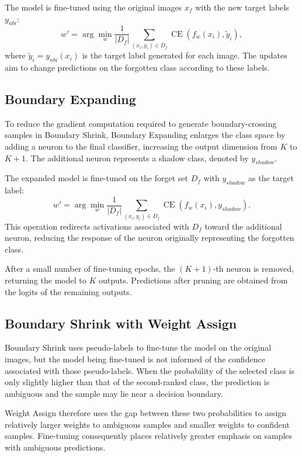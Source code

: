 \documentclass[conference]{IEEEtran}
\newcommand{\CE}{\operatorname{CE}}
\begin{document}
The model is fine-tuned using the original images $x_f$ with the new target labels $y_{nbi}$:
\begin{equation}
w' = \arg\min_w \frac{1}{|D_f|}\sum_{(x_i,y_i)\in D_f} \CE(f_w(x_i),\widetilde y_i),
\end{equation}
where $\widetilde y_i=y_{nbi}(x_i)$ is the target label generated for each image. The updates aim to change predictions on the forgotten class according to these labels.

\subsection{Boundary Expanding}
To reduce the gradient computation required to generate boundary-crossing samples in Boundary Shrink, Boundary Expanding enlarges the class space by adding a neuron to the final classifier, increasing the output dimension from $K$ to $K+1$. The additional neuron represents a shadow class, denoted by $y_{shadow}$.

The expanded model is fine-tuned on the forget set $D_f$ with $y_{shadow}$ as the target label:
\begin{equation}
w'=\arg\min_w\frac{1}{|D_f|}\sum_{(x_i,y_i)\in D_f}\CE(f_w(x_i),y_{shadow}).
\end{equation}
This operation redirects activations associated with $D_f$ toward the additional neuron, reducing the response of the neuron originally representing the forgotten class.

After a small number of fine-tuning epochs, the $(K+1)$-th neuron is removed, returning the model to $K$ outputs. Predictions after pruning are obtained from the logits of the remaining outputs.


\subsection{Boundary Shrink with Weight Assign}

Boundary Shrink uses pseudo-labels to fine-tune the model on the original images, but the model being fine-tuned is not informed of the confidence associated with those pseudo-labels. When the probability of the selected class is only slightly higher than that of the second-ranked class, the prediction is ambiguous and the sample may lie near a decision boundary.

Weight Assign therefore uses the gap between these two probabilities to assign relatively larger weights to ambiguous samples and smaller weights to confident samples. Fine-tuning consequently places relatively greater emphasis on samples with ambiguous predictions.
\end{document}
